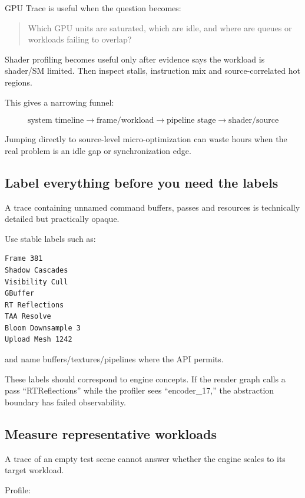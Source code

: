 GPU Trace is useful when the question becomes:

\begin{quote}
Which GPU units are saturated, which are idle, and where are queues or workloads failing to overlap?
\end{quote}

Shader profiling becomes useful only after evidence says the workload is shader/SM limited. Then inspect stalls, instruction mix and source-correlated hot regions.

This gives a narrowing funnel:

\[
\boxed{
\text{system timeline}
\rightarrow
\text{frame/workload}
\rightarrow
\text{pipeline stage}
\rightarrow
\text{shader/source}
}
\]

Jumping directly to source-level micro-optimization can waste hours when the real problem is an idle gap or synchronization edge.

\subsection{Label everything before you need the labels}\label{05-engine-i-ch008-label-everything-before-you-need-the-labels}

A trace containing unnamed command buffers, passes and resources is technically detailed but practically opaque.

Use stable labels such as:

\begin{verbatim}
Frame 381
Shadow Cascades
Visibility Cull
GBuffer
RT Reflections
TAA Resolve
Bloom Downsample 3
Upload Mesh 1242
\end{verbatim}

and name buffers/textures/pipelines where the API permits.

These labels should correspond to engine concepts. If the render graph calls a pass ``RTReflections'' while the profiler sees ``encoder\_17,'' the abstraction boundary has failed observability.

\subsection{Measure representative workloads}\label{05-engine-i-ch008-measure-representative-workloads}

A trace of an empty test scene cannot answer whether the engine scales to its target workload.

Profile:

